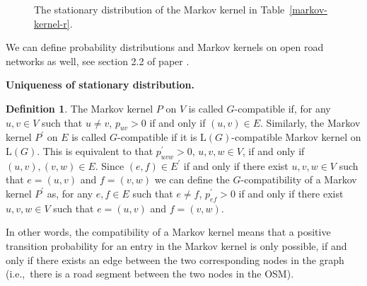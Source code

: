 \documentclass[b5paper,12pt]{report}
\theoremstyle{definition}
\newtheorem{definition}{Definition}
\begin{document}
\begin{figure}
\centering
{}
\caption{The stationary distribution of the Markov kernel in Table~\ref{markov-kernel-r}.}
\label{rho_graph}
\end{figure}

We can define probability distributions and Markov kernels on open road networks as well, see section 2.2 of paper \cite{traffic-paper}.

\smallskip

\textbf{Uniqueness of stationary distribution.} 

\begin{definition}
The Markov kernel $P$ on $V$ is called $G$-compatible if, for any $u,v\in V$ such that $u\neq v$, $p_{uv}>0$ if and only if $(u,v)\in E$. Similarly, the Markov kernel $P^\prime$ on $E$ is called $G$-compatible if it is $\text{L}(G)$-compatible Markov kernel on $\text{L}(G)$. 
This is equivalent to that $p^\prime_{uvw}>0$, $u,v,w\in V$, if and only if $(u,v),(v,w)\in E$. Since $(e,f)\in E^\prime$ if and only if there exist $u,v,w\in V$ such that $e=(u,v)$ and $f=(v,w)$ we can define the $G$-compatibility of a Markov kernel $P^\prime$ as, for any $e,f\in E$ such that $e\neq f$, $p^\prime_{ef}>0$ if and only if there exist $u,v,w\in V$ such that $e=(u,v)$ and $f=(v,w)$. 
\end{definition}

In other words, the compatibility of a Markov kernel means that a positive transition probability for an entry in the Markov kernel is only possible, if and only if there exists an edge between the two corresponding nodes in the graph (i.e.,~there is a road segment between the two nodes in the OSM).
\end{document}
